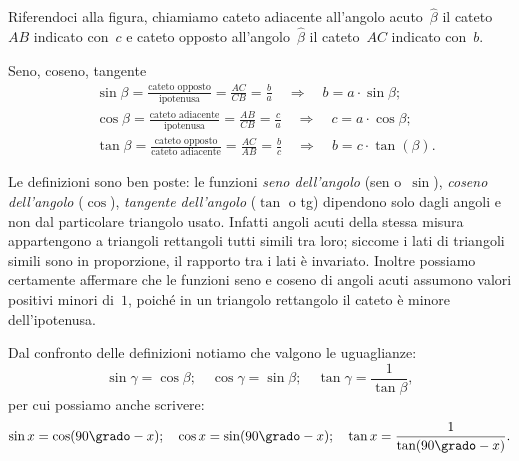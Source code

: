 Riferendoci alla figura, chiamiamo cateto adiacente all'angolo 
acuto~$\hat{\beta}$ il cateto~${AB}$ indicato con~$c$ e cateto opposto 
all'angolo~$\hat{\beta}$ il
cateto~${AC}$ indicato con~$b$.

\begin{definizione}
Seno, coseno, tangente
\begin{align*}
&\sin \beta=\frac{\text{cateto opposto}}{\text{ipotenusa}}=
\frac{AC}{CB}=\frac{b}{a} \quad \Rightarrow \quad b=a\cdot \sin \beta ;\\
&\cos \beta=\frac{\text{cateto adiacente}}{\text{ipotenusa}}=
\frac{AB}{CB}=\frac{c}{a} \quad \Rightarrow \quad c=a\cdot \cos \beta ;\\
&\tan \beta=\frac{\text{cateto opposto}}{\text{cateto adiacente}}=
\frac{AC}{AB}=\frac{b}{c} \quad \Rightarrow \quad b=c\cdot \tan(\beta ).
\end{align*}
\end{definizione}



Le definizioni sono ben poste: le funzioni \emph{seno dell'angolo} (sen 
o~$\sin$), \emph{coseno dell'angolo} ($\cos$), \emph{tangente dell'angolo}
($\tan$ o tg) dipendono solo dagli angoli e non dal particolare triangolo 
usato. 
Infatti angoli acuti della stessa misura appartengono a
triangoli rettangoli tutti simili tra loro; siccome i lati di triangoli 
simili 
sono in proporzione, il rapporto tra i lati è invariato.
Inoltre possiamo certamente affermare che le funzioni seno e coseno di angoli 
acuti assumono valori positivi minori di~$1$,
poiché in un triangolo rettangolo il cateto è minore dell'ipotenusa.

Dal confronto delle definizioni notiamo che valgono le uguaglianze:
 \[\sin \gamma=\cos \beta;\quad \cos \gamma=\sin \beta;\quad \tan 
\gamma=\frac{1}{\tan \beta},\]
 per cui possiamo anche scrivere:
\[\sin x=\cos (90\grado-x);\quad \cos x=\sin (90\grado-x);\quad 
\tan x=\frac{1}{\tan(90\grado-x)}.\]

